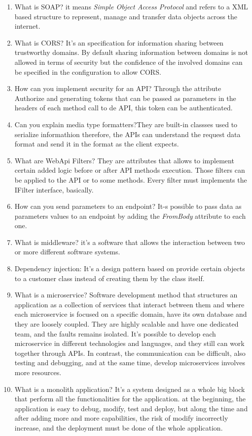\begin{multicols}{2}
\begin{enumerate}
\item What is SOAP? it means \emph{Simple Object Access Protocol} and refers to a XML based structure to represent, manage and transfer data objects across the internet.
\item What is CORS? It's an specification for information sharing between trustworthy domains. By default sharing information between domains is not allowed in terms of security but the confidence of the involved domains can be specified in the configuration to allow CORS.
\item How can you implement security for an API? Through the attribute Authorize and generating tokens that can be passed as parameters in the headers of each method call to de API, this token can be authenticated.
\item Can you explain media type formatters?They are built-in classses used to serialize informathion therefore, the APIs can understand the request data format and send it in the format as the client expects.
\item What are WebApi Filters? They are attributes that allows to implement certain added logic before or after API methods execution. Those filters can be applied to the API or to some methods. Every filter must implements the IFilter interface, basically.
\item How can you send parameters to an endpoint? It-s possible to pass data as parameters values to an endpoint by adding the \emph{FromBody} attribute to each one.
\item What is middleware? it's a software that allows the interaction between two or more different software systems.
\item Dependency injection: It's a design pattern based on provide certain objects to a customer class instead of creating them by the class itself.
\item What is a microservice? Software development method that structures an application as a collection of services that interact between them and where each microservice is focused on a specific domain, have its own database and they are loosely coupled. They are highly scalable and have one dedicated team, and the faults remains isolated. It's possible to develop each microservice in different technologies and languages, and they still can work together through APIs. In contrast, the communication can be difficult, also testing and debugging, and at the same time, develop microservices involves more resources.
\item What is a monolith application? It's a system designed as a whole big block that perform all the functionalities for the application. at the beginning, the application is easy to debug, modify, test and deploy, but along the time and after adding more and more capabilities, the risk of modify incorrectly increase, and the deployment must be done of the whole application.

\end{enumerate}
\end{multicols}
